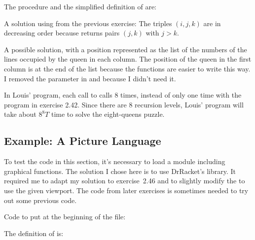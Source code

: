 \begin{exe}[2.40]
    The procedure  and the simplified definition of 
     are:
\end{exe}

\begin{exe}[2.41]
    A solution using  from the previous exercise:
    The triples $(i, j, k)$ are in decreasing order because  
    returns pairs $(j, k)$ with $j > k$.
\end{exe}

\begin{exe}[2.42]
    A possible solution, with a position represented as the list of the numbers 
    of the lines occupied by the queen in each column. The position of the queen 
    in the first column is at the end of the list because the functions are 
    easier to write this way. I removed the  parameter in  
    and  because I didn’t need it.
\end{exe}

\begin{exe}[2.43]
    In Louis’ program, each call to  calls 
     8 times, instead of only one time with the 
    program in exercise 2.42. Since there are 8 recursion levels, Louis’ program 
    will take about $8^8T$ time to solve the eight-queens puzzle.
\end{exe}

\subsection{Example: A Picture Language}

\begin{comp}
    To test the code in this section, it’s necessary to load a module including 
    graphical functions. The solution I chose here is to use DrRacket’s 
     library. It required me to adapt my solution to 
    exercise~2.46 and to slightly modify the  to use the 
    given viewport. The code from later exercises is sometimes needed to try out 
    some previous code.

    Code to put at the beginning of the file:
\end{comp}

\begin{exe}[2.44]
    The definition of  is:
\end{exe}

